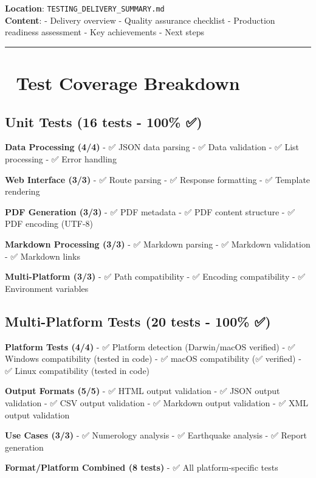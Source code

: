 \documentclass[
  11pt,
  oneside,
  openany]{scrbook}
\begin{document}
\textbf{Location}: \texttt{TESTING\_DELIVERY\_SUMMARY.md}\\
\textbf{Content}: - Delivery overview - Quality assurance checklist -
Production readiness assessment - Key achievements - Next steps

\begin{center}\rule{0.5\linewidth}{0.5pt}\end{center}

\section{🧪 Test Coverage Breakdown}\label{test-coverage-breakdown}

\subsection{Unit Tests (16 tests - 100\%
✅)}\label{unit-tests-16-tests---100}

\textbf{Data Processing (4/4)} - ✅ JSON data parsing - ✅ Data
validation - ✅ List processing - ✅ Error handling

\textbf{Web Interface (3/3)} - ✅ Route parsing - ✅ Response formatting
- ✅ Template rendering

\textbf{PDF Generation (3/3)} - ✅ PDF metadata - ✅ PDF content
structure - ✅ PDF encoding (UTF-8)

\textbf{Markdown Processing (3/3)} - ✅ Markdown parsing - ✅ Markdown
validation - ✅ Markdown links

\textbf{Multi-Platform (3/3)} - ✅ Path compatibility - ✅ Encoding
compatibility - ✅ Environment variables

\subsection{Multi-Platform Tests (20 tests - 100\%
✅)}\label{multi-platform-tests-20-tests---100}

\textbf{Platform Tests (4/4)} - ✅ Platform detection (Darwin/macOS
verified) - ✅ Windows compatibility (tested in code) - ✅ macOS
compatibility (✅ verified) - ✅ Linux compatibility (tested in code)

\textbf{Output Formats (5/5)} - ✅ HTML output validation - ✅ JSON
output validation - ✅ CSV output validation - ✅ Markdown output
validation - ✅ XML output validation

\textbf{Use Cases (3/3)} - ✅ Numerology analysis - ✅ Earthquake
analysis - ✅ Report generation

\textbf{Format/Platform Combined (8 tests)} - ✅ All platform-specific
tests
\end{document}
